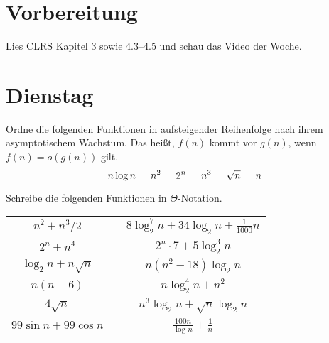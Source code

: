 \documentclass{uebung_cs}
\begin{document}
\section*{Vorbereitung}
Lies CLRS Kapitel 3 sowie 4.3--4.5 und schau das Video der Woche.

\section*{Dienstag}
\begin{aufgabe}\label{tue-first}\mbox{}
	Ordne die folgenden Funktionen in aufsteigender Reihenfolge nach ihrem asymptotischem Wachstum.
	Das heißt, $f(n)$ kommt vor $g(n)$, wenn $f(n) = o(g(n))$ gilt.
	\[n \log n\hspace*{15pt} n^2\hspace*{15pt} 2^n\hspace*{15pt} n^3\hspace*{15pt} \sqrt{n}\hspace*{15pt} n\]
	
\end{aufgabe}

\begin{aufgabe}
	Schreibe die folgenden Funktionen in $\Theta$-Notation.
	\begin{center}
		\begin{tabular}{ccc}
			$n^2 + n^3/2$
			&&
			$8\log_2^7 n + 34\log_2 n + \frac{1}{1000}n$\\
			$2^n + n^4$&&
			$2^n\cdot 7 + 5\log_2^3 n$\\
			$\log_2n + n\sqrt{n}$&&
			$n(n^2 - 18)\log_2 n$\\
			$n(n-6)$&&
			$n\log_2^4 n + n^2$\\
			$4\sqrt{n}$&&
			$n^3 \log_2 n + \sqrt{n}\log_2 n$\\
			$99\sin n + 99\cos n$&& $\frac{100n}{\log n}+\frac{1}{n}$
		\end{tabular}
	\end{center}
	
\end{aufgabe}
\end{document}
